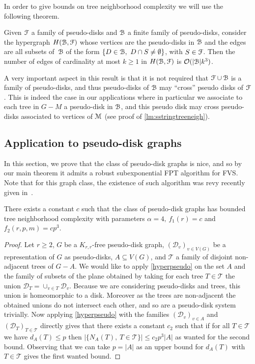 \documentclass{amsart}
\newcommand{\D}{\mathcal{D}} \newcommand{\R}{\mathcal{R}} \newcommand{\C}{\mathcal{C}} \newcommand{\E}{\mathcal{E}}
\newcommand{\mT}{\mathcal{T}}
\newcommand{\FVS}{\textsc{FVS}\xspace}
\renewcommand{\O}{\mathcal{O}}
\begin{document}
 In order to give bounds on tree neighborhood complexity we will use the following theorem.
 
 \begin{theorem}\label{hyperpseudo}
    Given $\EuScript{F}$ a family of pseudo-disks and $\EuScript B$ a finite family of pseudo-disks, consider the hypergraph $H(\EuScript B,\EuScript F)$ whose vertices are the pseudo-disks in $\EuScript B$ and the edges are all subsets of~$\EuScript B$ of the form $\{D \in \EuScript B,~D \cap S \neq \emptyset\}$, with $S\in \EuScript F$.
  Then the number of edges of cardinality at most $k\geq 1$ in $H(\EuScript B,\EuScript F)$ is $\O(|\EuScript B|k^3)$.
\end{theorem}
A very important aspect in this result is that it is not required that $\EuScript{F} \cup \EuScript{B}$ is a family of pseudo-disks, and thus pseudo-disks of $\EuScript B$ may ``cross'' pseudo disks of $\EuScript F$.
This is indeed the case in our applications where in particular we associate to each tree in $G-M$ a pseudo-disk in $\EuScript{B}$, and this pseudo disk may cross pseudo-disks associated to vertices of  $\EuScript{M}$ (see proof of \autoref{lm:sstringtreeneigh}).

 


\subsection{Application to pseudo-disk graphs}
In this section, we prove that the class of pseudo-disk graphs is nice, and so by our main theorem it admits a robust subexponential FPT algorithm for \FVS. Note that for this graph class, the existence of such algorithm was revy recently given in~\cite{FVS-WG}.
\begin{lemma}\label{lm:pseudotreeneigh}
    There exists a constant $c$ such that the class of pseudo-disk graphs has bounded tree neighborhood complexity with parameters $\alpha=4,~f_1(r)=c$ and $f_2(r,p,m)=cp^3$.
\end{lemma}
\begin{proof}
Let $r\geq 2$, $G$ be a $K_{r,r}$-free pseudo-disk graph, $(\D_v)_{v\in V(G)}$ be a representation of $G$ as pseudo-disks, $A\subseteq V(G)$, and $\mT$ a family of disjoint non-adjacent trees of $G-A$. We would like to apply \autoref{hyperpseudo} on the set $A$ and the family of subsets of the plane obtained by taking for each tree $T\in \mT$ the union $\D_T=\cup_{v\in T} \D_v$. Because we are considering pseudo-disks and trees, this union is homeomorphic to a disk. Moreover as the trees are non-adjacent the obtained unions do not intersect each other, and so are a pseudo-disk system trivially. Now applying \autoref{hyperpseudo} with the families $(\D_v)_{v\in A}$ and $(\D_T)_{T\in \mT}$ directly gives that there exists a constant $c_2$ such that if for all $T\in \mT$ we have $d_A(T)\leq p$ then $|\{N_A(T),~T\in \mT\}|\leq c_2p^3|A|$ as wanted for the second bound. Observing that we can take $p=|A|$ as an upper bound for $d_A(T)$ with $T\in \mT$ gives the first wanted bound.
\end{proof}
\end{document}
